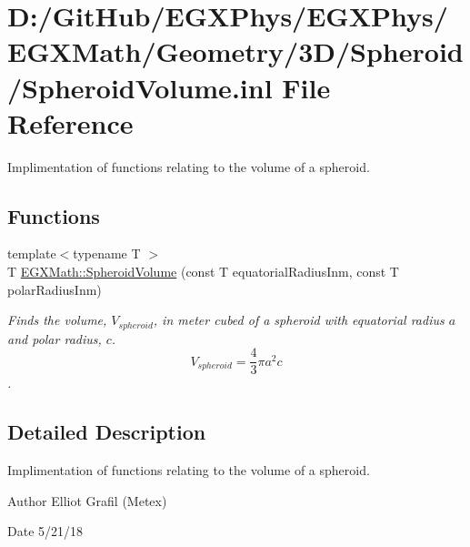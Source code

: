 \hypertarget{_spheroid_volume_8inl}{}\section{D\+:/\+Git\+Hub/\+E\+G\+X\+Phys/\+E\+G\+X\+Phys/\+E\+G\+X\+Math/\+Geometry/3\+D/\+Spheroid/\+Spheroid\+Volume.inl File Reference}
\label{_spheroid_volume_8inl}


Implimentation of functions relating to the volume of a spheroid.  


\subsection*{Functions}
\begin{DoxyCompactItemize}
\item 
{\footnotesize template$<$typename T $>$ }\\T \mbox{\hyperlink{group___e_g_x_math-_geometry-3_d-_spheroid-_volume_ga12125484235e94b8f2580f3476b05b92}{E\+G\+X\+Math\+::\+Spheroid\+Volume}} (const T equatorial\+Radius\+Inm, const T polar\+Radius\+Inm)
\begin{DoxyCompactList}\small\item\em Finds the volume, $V_{spheroid}$, in meter cubed of a spheroid with equatorial radius $a$ and polar radius, $c$. \[ V_{spheroid}=\frac{4}{3}\pi a^2 c \]. \end{DoxyCompactList}\end{DoxyCompactItemize}


\subsection{Detailed Description}
Implimentation of functions relating to the volume of a spheroid. 

\begin{DoxyAuthor}{Author}
Elliot Grafil (Metex) 
\end{DoxyAuthor}
\begin{DoxyDate}{Date}
5/21/18 
\end{DoxyDate}
